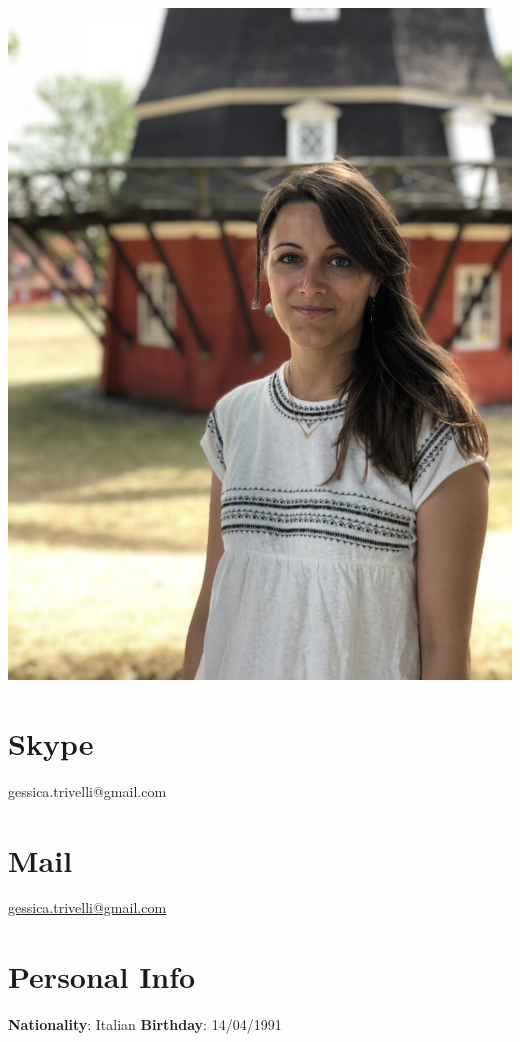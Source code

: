 \documentclass[11pt]{friggeri-cv}
\begin{document}
  \begin{aside}
    \includegraphics[width=0.95\columnwidth]{img/IMG_2838}
    \section{Skype}\footnotesize{
    gessica.trivelli@gmail.com}
    \section{Mail}\footnotesize{
    \href{mailto:gessica.trivelli@gmail.com}{gessica.trivelli@gmail.com}}
    \section{Personal Info}\footnotesize{
    \textbf{Nationality}: Italian
    \textbf{Birthday}: 14/04/1991}
  \end{aside}

\vspace{-10pt}
\end{document}
